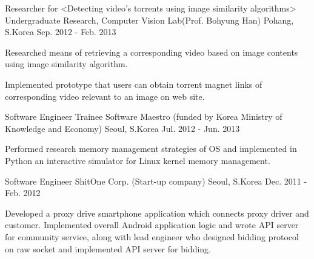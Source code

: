 \begin{cventries}
  \cventry
    {Researcher for <Detecting video’s torrents using image similarity algorithms>} %
    {Undergraduate Research, Computer Vision Lab(Prof. Bohyung Han)} %
    {Pohang, S.Korea} %
    {Sep. 2012 - Feb. 2013} %
    {
      \begin{cvitems} %
        \item {Researched means of retrieving a corresponding video based on image contents using image similarity algorithm.}
        \item {Implemented prototype that users can obtain torrent magnet links of corresponding video relevant to an image on web site.}
      \end{cvitems} 
    }

  \cventry
    {Software Engineer Trainee} %
    {Software Maestro (funded by Korea Ministry of Knowledge and Economy)} %
    {Seoul, S.Korea} %
    {Jul. 2012 - Jun. 2013} %
    {
      \begin{cvitems} %
        \item {Performed research memory management strategies of OS and implemented in Python an interactive simulator for Linux kernel memory management.}
      \end{cvitems}
    }

  \cventry
    {Software Engineer} %
    {ShitOne Corp. (Start-up company)} %
    {Seoul, S.Korea} %
    {Dec. 2011 - Feb. 2012} %
    {
      \begin{cvitems} %
        \item {Developed a proxy drive smartphone application which connects proxy driver and customer. Implemented overall Android application logic and wrote API server for community service, along with lead engineer who designed bidding protocol on raw socket and implemented API server for bidding.}
      \end{cvitems}
    }


\end{cventries}
